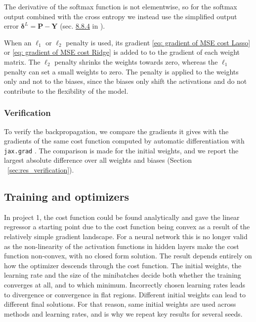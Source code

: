 \documentclass[reprint,english,notitlepage, floatfix]{revtex4-2}  %
\begin{document}
The derivative of the softmax function is not elementwise, so for the softmax output combined with the cross entropy we instead use the simplified output error $\boldsymbol{\delta}^L = \boldsymbol{P} - \boldsymbol{Y}$ (sec. \href{https://educationalmaterialuio.github.io/MachineLearningUiO/doc/LectureNotes/_build/html/chapter8.html#the-four-equations-of-backpropagation}{8.8.4} in \cite{lecture_book}).

When an $\ell_1$ or $\ell_2$ penalty is used, its gradient \autoref{eq: gradient of MSE cost Lasso} or \autoref{eq: gradient of MSE cost Ridge} is added to to the gradient of each weight matrix. The $\ell_2$ penalty shrinks the weights towards zero, whereas the $\ell_1$ penalty can set a small weights to zero. The penalty is applied to the weights only and not to the biases, since the biases only shift the activations and do not contribute to the flexibility of the model. 

\subsubsection{Verification}

To verify the backpropagation, we compare the gradients it gives with the gradients of the same cost function computed by automatic differentiation with \texttt{jax.grad} \cite{jax}. The comparison is made for the initial weights, and we report the largest absolute difference over all weights and biases (Section ~\ref{sec:res_verification}).

\subsection{Training and optimizers}
In project 1, the cost function could be found analytically and gave the linear regressor a starting point due to the cost function being convex as a result of the relatively simple gradient landscape. For a neural network this is no longer valid as the non-linearity of the activation functions in hidden layers make the cost function non-convex, with no closed form solution. The result depends entirely on how the optimizer descends through the cost function. The initial weights, the learning rate and the size of the minibatches decide both whether the training converges at all, and to which minimum. Incorrectly chosen learning rates leads to divergence or convergence in flat regions. Different initial weights can lead to different final solutions. For that reason, same initial weights are used across methods and learning rates, and is why we repeat key results for several seeds.
\end{document}
